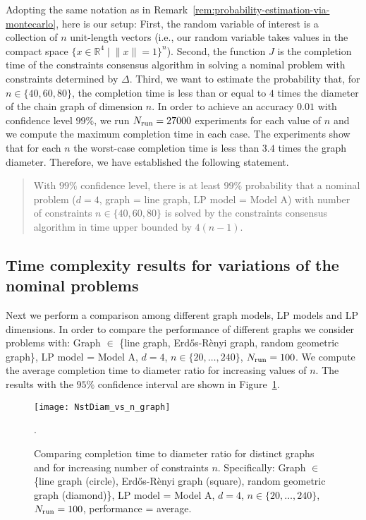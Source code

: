 \documentclass[onecolumn,journal,letterpaper]{IEEEtran}
\newcommand{\real}{{\mathbb{R}}}
\newcommand{\subscr}[2]{{#1}_{\textup{#2}}}
\newcommand{\setdef}[2]{\{#1 \; | \; #2\}}
\begin{document}
Adopting the same notation as in
Remark~\ref{rem:probability-estimation-via-montecarlo}, here is our setup:
First, the random variable of interest is a collection of $n$ unit-length
vectors (i.e., our random variable takes values in the compact space
$\setdef{x\in\real^4}{\|x\|=1}^n$).  Second, the function $J$ is the
completion time of the constraints consensus algorithm in solving a nominal
problem with constraints determined by $\Delta$.  Third, we want to
estimate the probability that, for $n\in\{40,60,80\}$, the completion time
is less than or equal to $4$ times the diameter of the chain graph of
dimension $n$.  In order to achieve an accuracy $0.01$ with confidence
level $99\%$, we run $\subscr{N}{run}=27000$ experiments for each value of
$n$ and we compute the maximum completion time in each case.  The
experiments show that for each $n$ the worst-case completion time is less
than $3.4$ times the graph diameter.  Therefore, we have established the
following statement.
\begin{quote}
  With $99\%$ confidence level, there is at least $99\%$ probability that a
  nominal problem ($d=4$, graph = line graph, LP model = Model A) with
  number of constraints $n\in\{40,60,80\}$ is solved by the constraints
  consensus algorithm in time upper bounded by $4(n-1)$.
\end{quote}



\subsection{Time complexity results for variations of the nominal problems}
Next we perform a comparison among different graph models, LP models and LP
dimensions. In order to compare the performance of different graphs we
consider problems with: Graph $\in$ \{line graph, Erd\H{o}s-R\`enyi graph,
random geometric graph\}, LP model = Model A, $d=4$,
$n\in\{20,\dots,240\}$, $\subscr{N}{run}=100$. We compute the average
completion time to diameter ratio for increasing values of $n$. The results
with the $95\%$ confidence interval are shown in
Figure~\ref{fig:Nst_vs_n_graph}.

\begin{figure}[h]
\begin{center}
\texttt{[image: NstDiam\_vs\_n\_graph]}\caption{Comparing completion time to diameter ratio for distinct graphs
    and for increasing number of constraints $n$. Specifically: Graph $\in$
    \{line graph (circle), Erd\H{o}s-R\`enyi graph (square), random
    geometric graph (diamond)\}, LP model = Model A, $d=4$,
    $n\in\{20,\dots,240\}$, $\subscr{N}{run}=100$, performance = average.}.
  \label{fig:Nst_vs_n_graph}
\end{center}
\end{figure}
\end{document}
